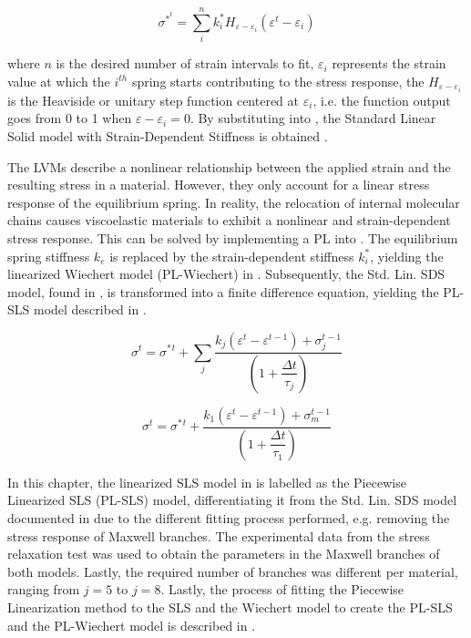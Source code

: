 \begin{equation}
\label{eq5}
\sigma^{*^t} = \sum_i^n k_i^* H_{\varepsilon - \varepsilon_i}(\varepsilon^t - \varepsilon_i)
\end{equation}

\noindent where $n$ is the desired number of strain intervals to fit, $\varepsilon_i$ represents the strain value at which the $i^{th}$ spring starts contributing to the stress response, the $H_{\varepsilon - \varepsilon_i}$ is the Heaviside or unitary step function centered at $\varepsilon_i$, i.e. the function output goes from 0 to 1 when $\varepsilon - \varepsilon_i = 0$. By substituting  into , the Standard Linear Solid model with Strain-Dependent Stiffness is obtained \cite{austin2015control}.

The LVMs describe a nonlinear relationship between the applied strain and the resulting stress in a material. However, they only account for a linear stress response of the equilibrium spring. In reality, the relocation of internal molecular chains causes viscoelastic materials to exhibit a nonlinear and strain-dependent stress response. This can be solved by implementing a PL into . The equilibrium spring stiffness $k_e$ is replaced by the strain-dependent stiffness $k_i^*$, yielding the linearized Wiechert model (PL-Wiechert) in . Subsequently, the Std. Lin. SDS model, found in \cite{austin2015control}, is transformed into a finite difference equation, yielding the PL-SLS model described in .

\begin{equation}
\label{eq6}
\sigma^t = \sigma^*{^t} + \sum_j \frac{k_j (\varepsilon^t-\varepsilon^{t-1}) + \sigma_j^{t-1}}{\left( 1 + \dfrac{\Delta t}{\tau_j}\right) }
\end{equation}

\begin{equation}
\label{eq7}
\sigma^t = \sigma^*{^t} + \frac{k_1(\varepsilon^t - \varepsilon^{t-1}) + \sigma_m^{t-1}}{ \left( 1+\dfrac{\Delta t}{\tau_1} \right) }
\end{equation}

In this chapter, the linearized SLS model in  is labelled as the Piecewise Linearized SLS (PL-SLS) model, differentiating it from the Std. Lin. SDS model documented in \cite{austin2015control} due to the different fitting process performed, e.g. removing the stress response of Maxwell branches. The experimental data from the stress relaxation test was used to obtain the parameters in the Maxwell branches of both models. Lastly, the required number of branches was different per material, ranging from $j=5$ to $j=8$. Lastly, the process of fitting the Piecewise Linearization method to the SLS and the Wiechert model to create the PL-SLS and the PL-Wiechert model is described in .

